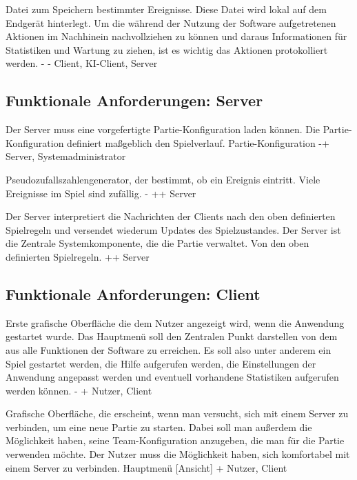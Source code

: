         {Datei zum Speichern bestimmter Ereignisse. Diese Datei wird lokal auf dem Endgerät hinterlegt.}
        {Um die während der Nutzung der Software aufgetretenen Aktionen im Nachhinein nachvollziehen zu können und daraus Informationen für Statistiken und Wartung zu ziehen, ist es wichtig das Aktionen protokolliert werden.}
        {-}
        {-}
        {Client, KI-Client, Server}
        

\subsection{Funktionale Anforderungen: Server}
        
        {Der Server muss eine vorgefertigte Partie-Konfiguration laden können.}
        {Die Partie-Konfiguration definiert maßgeblich den Spielverlauf.}
        {Partie-Konfiguration}
        {-+}
        {Server, Systemadministrator}

        {Pseudozufallszahlengenerator, der bestimmt, ob ein Ereignis eintritt.}
        {Viele Ereignisse im Spiel sind zufällig.}
        {-}
        {++}
        {Server}
        
        {Der Server interpretiert die Nachrichten der Clients nach den oben definierten Spielregeln und versendet wiederum Updates des Spielzustandes.}
        {Der Server ist die Zentrale Systemkomponente, die die Partie verwaltet.}
        {Von den oben definierten Spielregeln.}
        {++}
        {Server}
        

\subsection{Funktionale Anforderungen: Client}

        {Erste grafische Oberfläche die dem Nutzer angezeigt wird, wenn die Anwendung gestartet wurde.}
        {Das Hauptmenü soll den Zentralen Punkt darstellen von dem aus alle Funktionen der Software zu erreichen. Es soll also unter anderem ein Spiel gestartet werden, die Hilfe aufgerufen werden, die Einstellungen der Anwendung angepasst werden und eventuell vorhandene Statistiken aufgerufen werden können.}
        {-}
        {+}
        {Nutzer, Client}

        {Grafische Oberfläche, die erscheint, wenn man versucht, sich mit einem Server zu verbinden, um eine neue Partie zu starten. Dabei soll man außerdem die Möglichkeit haben, seine Team-Konfiguration anzugeben, die man für die Partie verwenden möchte.}
        {Der Nutzer muss die Möglichkeit haben, sich komfortabel mit einem Server zu verbinden.}
        {Hauptmenü [Ansicht]}
        {+}
        {Nutzer, Client}

